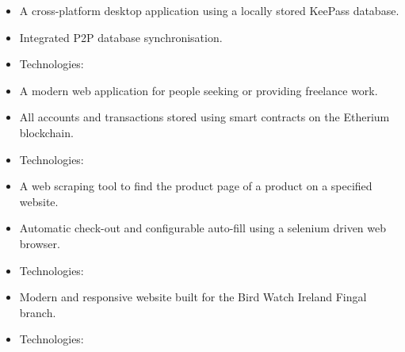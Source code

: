 \documentclass[8pt,a4paper,ragged2e, normalphoto]{altacv-dean}
\begin{document}
    
    \divider
    


    \begin{itemize}
        \item A cross-platform desktop application using a locally stored KeePass database.
        \item Integrated P2P database synchronisation.
        \item Technologies:   
    \end{itemize}
    \divider

    \begin{itemize}
        \item  A modern web application for people seeking or providing freelance work.
        \item All accounts and transactions stored using smart contracts on the Etherium blockchain.
        \item Technologies:    
    \end{itemize}
    
\begin{fullwidth}
    \divider
    
    \begin{itemize}
        \item A web scraping tool to find the product page of a product on a specified website.
        \item Automatic check-out and configurable auto-fill using a selenium driven web browser.
        \item Technologies:   
    \end{itemize}
    \divider
    
    \begin{itemize}
        \item Modern and responsive website built for the Bird Watch Ireland Fingal branch.
        \item Technologies:   
    \end{itemize}

\end{fullwidth}
\end{document}
